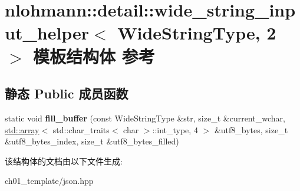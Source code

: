 \hypertarget{structnlohmann_1_1detail_1_1wide__string__input__helper_3_01_wide_string_type_00_012_01_4}{}\section{nlohmann\+::detail\+::wide\+\_\+string\+\_\+input\+\_\+helper$<$ Wide\+String\+Type, 2 $>$ 模板结构体 参考}
\label{structnlohmann_1_1detail_1_1wide__string__input__helper_3_01_wide_string_type_00_012_01_4}
\subsection*{静态 Public 成员函数}
\begin{DoxyCompactItemize}
\item 
\mbox{\label{structnlohmann_1_1detail_1_1wide__string__input__helper_3_01_wide_string_type_00_012_01_4_a7ede7749f186f1a6a46c08abb607fd5c}} 
static void {\bfseries fill\+\_\+buffer} (const Wide\+String\+Type \&str, size\+\_\+t \&current\+\_\+wchar, \mbox{\hyperlink{namespacenlohmann_1_1detail_a1ed8fc6239da25abcaf681d30ace4985af1f713c9e000f5d3f280adbd124df4f5}{std\+::array}}$<$ std\+::char\+\_\+traits$<$ char $>$\+::int\+\_\+type, 4 $>$ \&utf8\+\_\+bytes, size\+\_\+t \&utf8\+\_\+bytes\+\_\+index, size\+\_\+t \&utf8\+\_\+bytes\+\_\+filled)
\end{DoxyCompactItemize}


该结构体的文档由以下文件生成\+:\begin{DoxyCompactItemize}
\item 
ch01\+\_\+template/json.\+hpp\end{DoxyCompactItemize}
